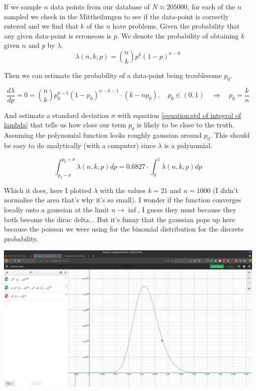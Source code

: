 \documentclass[12pt]{article}
\newcommand{\RA}{\Rightarrow}
\begin{document}
If we sample $n$ data points from our database of $N \approx 205 000$, for each of the $n$ sampled we check in the Mittheilungen to see if the data-point is correctly entered and we find that $k$ of the $n$ have problems. Given the probability that any given data-point is erroneous is $p$. We denote the probability of obtaining $k$ given $n$ and $p$ by $\lambda$. \\

\begin{equation}
    \lambda(n,k,p) = {n \choose k} p^k (1-p)^{n-k}
\end{equation}

Then we can estimate the probability of a data-point being troublesome $p_0$. 

\begin{equation}
    \frac{d\lambda}{dp} = 0 = {n \choose k} p_0^{k-1} (1-p_0)^{n-k-1} \cdot (k-np_0)
    , \quad p_0 \in (0,1) \quad \RA \quad 
    p_0 = \frac{k}{n}
\end{equation}

And estimate a standard deviation $\sigma$ with equation \ref{equation:std of integral of lambda} that tells us how close our term $p_0$ is likely to be close to the truth. Assuming the polynomial function looks roughly gaussian around $p_0$. This should be easy to do analytically (with a computer) since $\lambda$ is a polynomial.

\begin{equation}\label{equation:std of integral of lambda}
    \int_{p_0-\sigma}^{p_0+\sigma} \lambda(n,k,p) dp = 0.6827 \cdot \int_0^1 \lambda(n,k,p) dp
\end{equation}

Which it does, here I plotted $\lambda$ with the values $k=21$ and $n=1000$ (I didn't normalise the area that's why it's so small). I wonder if the function converges locally onto a gaussian at the limit $n\to\inf$, I guess they must because they both become the dirac delta... But it's funny that the gaussian pops up here because the poisson we were using for the binomial distribution for the discrete probability.\\

{\centering
\caption{}
\includegraphics[width=\linewidth]{Screenshot at 2019-08-19 00-20-14.png}
\par}
\end{document}
